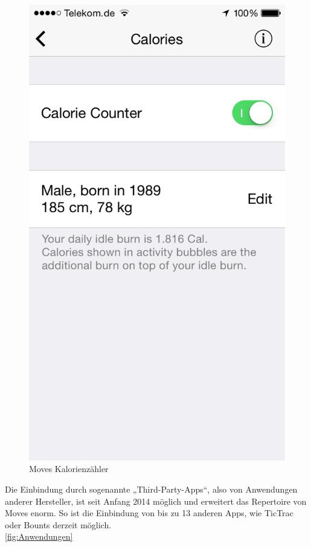 \begin{figure}[]
\begin{minipage}[t]{0.47\textwidth}
    \includegraphics[scale=0.3]{images/moves-app-calories.png}   
    \caption{Moves Kalorienzähler \cite{fig:Calories}}
    \label{fig:Calories}
  \end{minipage}
\end{figure}

Die Einbindung durch sogenannte „Third-Party-Apps“, also von Anwendungen anderer Hersteller, ist seit Anfang 2014 möglich und erweitert das Repertoire von Moves enorm. 
So ist die Einbindung von bis zu 13 anderen Apps, wie TicTrac oder Bounts derzeit möglich.\cite{web:MovesThird}
\\
\ref{fig:Anwendungen}

